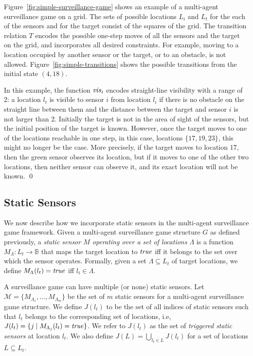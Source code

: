 \begin{example}\label{ex:simple-surveillance-game}
Figure~\ref{fig:simple-surveillance-game} shows an example of a multi-agent surveillance game on a grid.  The sets of possible locations $L_i$ and $L_t$ for the each of the sensors and for the target consist of the squares of the  grid. The transition relation $T$ encodes the possible one-step moves of all the sensors and the target on the grid, and incorporates all desired constraints. For example, moving to a location occupied by another sensor or the target, or to an obstacle, is not allowed. Figure~\ref{fig:simple-transitions} shows the possible transitions from the initial state $(4,18)$.

In this example, the function $\mathit{vis}_i$ encodes straight-line visibility with a range of 2: a location $l_t$ is visible to sensor $i$ from location $l_i$ if there is no obstacle on the straight line between them and the distance between the target and sensor $i$ is not larger than 2. Initially the target is not in the area of sight of the sensors, but the initial position of the target is known. However, once the target moves to one of the locations reachable in one step, in this case, locations $\{17,19,23\}$, this might no longer be the case. More precisely, if the target moves to location $17$, then the green sensor observes its location, but if it moves to one of the other two locations, then neither sensor can observe it, and its exact location will not be known. \qed
\end{example}


\subsection{Static Sensors}
We now describe how we incorporate static sensors in the multi-agent surveillance game framework. Given a multi-agent surveillance game structure $G$ as defined previously, a \emph{static sensor $M$ operating over a set of locations $\Lambda$} is a function $M_{\Lambda} : L_t \rightarrow \mathbb{B}$ that maps the target location to $\mathit{true}$ iff it belongs to the set  over which the sensor operates.  Formally, given a set $\Lambda \subseteq L_t$ of target locations, we define $M_{\Lambda}(l_t) = \mathit{true}$ iff $l_t \in \Lambda$. 

A surveillance game can have multiple (or none) static sensors. Let $\mathcal{M} = \{M_{\Lambda_1},\dots,M_{\Lambda_m}\}$ be the set of $m$ static sensors for a multi-agent surveillance game structure. We define $J(l_t)$ to be the set of all indices of static sensors such that $l_t$ belongs to the corresponding set of locations, i.e, $J(l_t) = \{j \mid M_{\Lambda_j}(l_t) = \mathit{true}\}$. We refer to $J(l_t)$ as the set of \emph{triggered static sensors} at location $l_t$. We also define $J(L) = \bigcup_{l_t \in L} J(l_t)$ for a set of locations $L \subseteq L_t$. 

